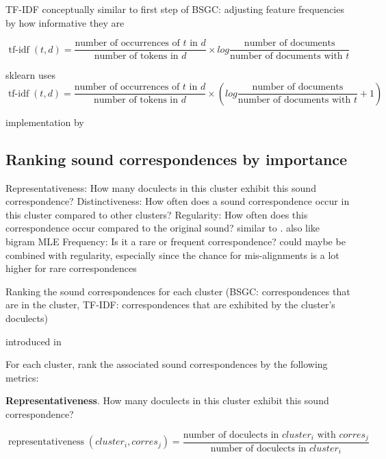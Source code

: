 \documentclass{article}
\begin{document}
TF-IDF conceptually similar to first step of BSGC: adjusting feature frequencies by how informative they are

\begin{equation*}
\operatorname{tf-idf}(t, d) =
\frac{\text{number of occurrences of } t \text{ in } d}
{\text{number of tokens in } d}
\times
log
\frac{\text{number of documents}}
{\text{number of documents with } t}
\end{equation*}

sklearn uses 
\begin{equation*}
\operatorname{tf-idf}(t, d) =
\frac{\text{number of occurrences of } t \text{ in } d}
{\text{number of tokens in } d}
\times
(
log
\frac{\text{number of documents}}
{\text{number of documents with } t}
+ 1)
\end{equation*}

implementation by \cite{pedregosa2011scikit-learn:}

\subsection{Ranking sound correspondences by importance}

Representativeness: How many doculects in this cluster exhibit this sound correspondence? \citep{wieling2011bipartite}
Distinctiveness: How often does a sound correspondence occur in this cluster compared to other clusters? \citep{wieling2011bipartite}
Regularity: How often does this correspondence occur compared to the original sound? similar to \citet{prokic2013combining}. also like bigram MLE
Frequency: Is it a rare or frequent correspondence? could maybe be combined with regularity, especially since the chance for mis-alignments is a lot higher for rare correspondences

Ranking the sound correspondences for each cluster
(BSGC: correspondences that are in the cluster,
TF-IDF: correspondences that are exhibited by the cluster's doculects)

introduced in \citet{wieling2011bipartite}

For each cluster, rank the associated sound correspondences by the following metrics:

\textbf{Representativeness}.
How many doculects in this cluster exhibit this sound correspondence?

\begin{equation*}
\operatorname{representativeness}(cluster_i, corres_j) = 
\frac{\text{number of doculects in } cluster_i \text{ with }  corres_j}
{\text{number of doculects in }  cluster_i}
\end{equation*}
\end{document}
